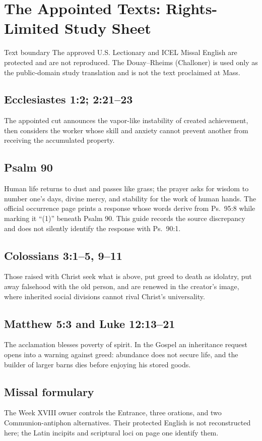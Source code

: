 \section*{The Appointed Texts: Rights-Limited Study Sheet}
\begin{studybox}{Text boundary}
The approved U.S. Lectionary and ICEL Missal English are protected and are not
reproduced. The Douay--Rheims (Challoner) is used only as the public-domain
study translation and is not the text proclaimed at Mass.
\end{studybox}
\subsection*{Ecclesiastes 1:2; 2:21--23}
The appointed cut announces the vapor-like instability of created achievement,
then considers the worker whose skill and anxiety cannot prevent another from
receiving the accumulated property.
\subsection*{Psalm 90}
Human life returns to dust and passes like grass; the prayer asks for wisdom
to number one's days, divine mercy, and stability for the work of human hands.
The official occurrence page prints a response whose words derive from
Ps.~95:8 while marking it ``(1)'' beneath Psalm 90. This guide records the
source discrepancy and does not silently identify the response with Ps.~90:1.
\subsection*{Colossians 3:1--5, 9--11}
Those raised with Christ seek what is above, put greed to death as idolatry,
put away falsehood with the old person, and are renewed in the creator's image,
where inherited social divisions cannot rival Christ's universality.
\subsection*{Matthew 5:3 and Luke 12:13--21}
The acclamation blesses poverty of spirit. In the Gospel an inheritance
request opens into a warning against greed: abundance does not secure life,
and the builder of larger barns dies before enjoying his stored goods.
\subsection*{Missal formulary}
The Week XVIII owner controls the Entrance, three orations, and two
Communion-antiphon alternatives. Their protected English is not reconstructed
here; the Latin incipits and scriptural loci on page one identify them.
